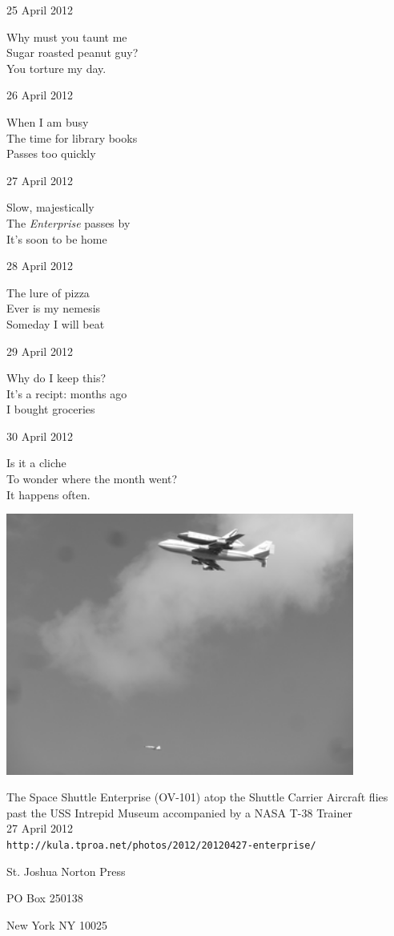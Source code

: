 \documentclass[12pt]{article}
\begin{document}
25 April 2012

Why must you taunt me \\
Sugar roasted peanut guy? \\
You torture my day.

26 April 2012

When I am busy \\
The time for library books \\
Passes too quickly

27 April 2012

Slow, majestically \\
The {\em Enterprise} passes by \\
It's soon to be home

28 April 2012

The lure of pizza \\
Ever is my nemesis \\
Someday I will beat

29 April 2012

Why do I keep this? \\
It's a recipt: months ago \\
I bought groceries

30 April 2012

Is it a cliche \\
To wonder where the month went? \\
It happens often.

\newpage

\begin{center}
\includegraphics[width=325pt]{enterprise.png}

The Space Shuttle Enterprise (OV-101) atop the Shuttle Carrier Aircraft 
flies past the USS Intrepid Museum accompanied by a NASA T-38 Trainer  \\
27 April 2012 \\
{\tt http://kula.tproa.net/photos/2012/20120427-enterprise/}
\end{center}

\newpage

\thispagestyle{empty}
\vspace*{12cm}
\begin{sideways}
\Large{St. Joshua Norton Press}
\end{sideways}
\begin{sideways}
\Large{PO Box 250138}
\end{sideways}
\begin{sideways}
\Large{New York NY 10025}
\end{sideways}
\end{document}
